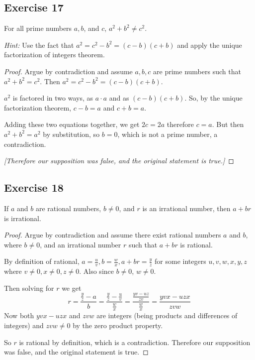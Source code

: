 \documentclass[14pt]{extarticle}
\begin{document}
\subsection{Exercise 17}
For all prime numbers $a, b$, and $c$, $a^2 + b^2 \neq c^2$.

    {\it Hint:} Use the fact that $a^2 = c^2 - b^2 = (c - b)(c + b)$ and apply the unique factorization of integers theorem.

\begin{proof}
    Argue by contradiction and assume $a,b,c$ are prime numbers such that $a^2 + b^2 = c^2$. Then $a^2 = c^2 - b^2 = (c - b)(c + b)$.

    $a^2$ is factored in two ways, as $a \cdot a$ and as $(c-b)(c+b)$. So, by the unique factorization theorem, $c-b = a$ and $c+b = a$.

    Adding these two equations together, we get $2c = 2a$ therefore $c = a$. But then $a^2 + b^2 = a^2$ by substitution, so $b=0$, which is not a prime number, a contradiction.

        {\it [Therefore our supposition was false, and the original statement is true.]}
\end{proof}

\subsection{Exercise 18}
If $a$ and $b$ are rational numbers, $b \neq 0$, and $r$ is an irrational number, then $a + br$ is irrational.

\begin{proof}
    Argue by contradiction and assume there exist rational numbers $a$ and $b$, where $b \neq 0$, and an irrational number $r$ such that $a + br$ is rational.

    By definition of rational, $a = \frac{u}{v}, b = \frac{w}{x}, a+br = \frac{y}{z}$ for some integers $u,v,w,x,y,z$ where $v \neq 0, x \neq 0, z \neq 0$. Also since $b \neq 0$, $w \neq 0$.

    Then solving for $r$ we get
    \[
        r = \frac{\frac{y}{z}-a}{b} = \frac{\frac{y}{z}-\frac{u}{v}}{\frac{w}{x}} = \frac{\frac{yv-uz}{zv}}{\frac{w}{x}} = \frac{yvx-uzx}{zvw}
    \]
    Now both $yvx-uzx$ and $zvw$ are integers (being products and differences of integers) and $zvw \neq 0$ by the zero product property.

    So $r$ is rational by definition, which is a contradiction. Therefore our supposition was false, and the original statement is true.
\end{proof}
\end{document}
